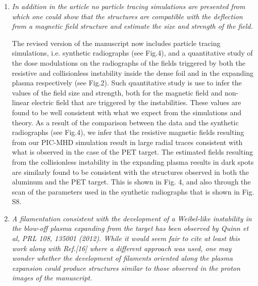 \documentclass{article}
\begin{document}
\begin{enumerate}
\item \textit{In addition in the article no particle tracing simulations are presented from which one could show that the structures are compatible with the deflection from a magnetic field structure and estimate the size and strength of the field. }

The revised version of the manuscript now includes particle tracing simulations, i.e. synthetic radiographs (see Fig.4), and a quantitative study of the dose modulations on the radiographs of the  fields triggered by both  the resistive and collisionless instability inside the dense foil and in the expanding plasma respectively (see Fig.2). Such quantitative study is use to infer the values of the field size and strength, both for the magnetic field and non-linear electric field  that are triggered by the instabilities.  These values are found to be well consistent with what we expect from the simulations and theory.
As a result of the comparison between the data and the synthetic radiographs (see Fig.4), we infer that the resistive magnetic fields resulting from our PIC-MHD simulation result in large radial traces consistent with what is observed in the case of the PET target. The estimated fields resulting from the collisionless instability in the expanding plasma results in dark spots are similarly found to be consistent with the structures observed in both the aluminum and the PET target. This is shown in Fig. 4, and also through the scan of the parameters used in the synthetic radiographs that is shown in Fig. S8.

\item \textit{A filamentation consistent with the development of a Weibel-like instability in the blow-off plasma expanding from the target has been observed by Quinn et al, PRL 108, 135001 (2012). While it would seem fair to cite at least this work along with Ref.[16] where a different approach was used, one may wonder whether the development of filaments oriented along the plasma expansion could produce structures similar to those observed in the proton images of the manuscript. }


\end{enumerate}
\end{document}
